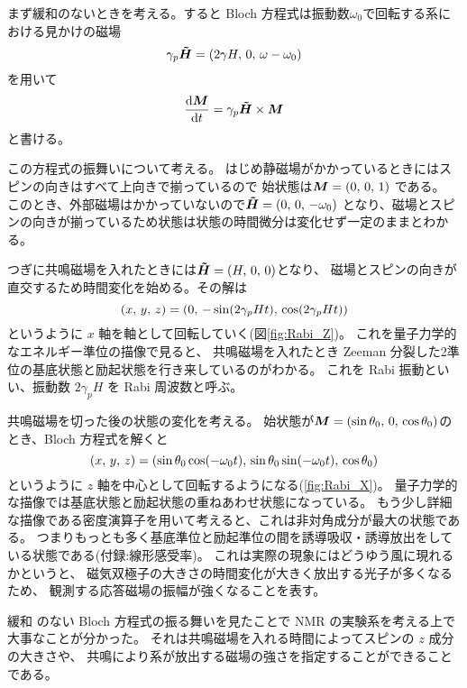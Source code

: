 \documentclass[11pt,dvipdfmx,a4paper]{jsarticle}
\begin{document}
まず緩和のないときを考える。すると Bloch 方程式は振動数\(\omega_0\)で回転する系における見かけの磁場
\begin{equation}
	\gamma_p \vb*{\tilde{H}} = \qty(2\gamma H,\,0,\,\omega-\omega_0)
\end{equation}
を用いて
\begin{equation}
	\dv{\vb*{M}}{t} = \gamma_p \vb*{\tilde{H}} \times \vb*{M}
\end{equation}
と書ける。

この方程式の振舞いについて考える。
はじめ静磁場がかかっているときにはスピンの向きはすべて上向きで揃っているので
始状態は\(\vb*{M}=(0,\,0,\,1)\)
である。
このとき、外部磁場はかかっていないので\(\vb*{\tilde{H}}=(0,\,0,\,-\omega_0)\)
となり、磁場とスピンの向きが揃っているため状態は状態の時間微分は変化せず一定のままとわかる。

つぎに共鳴磁場を入れたときには\(\vb*{\tilde{H}}=(H,\,0,\,0)\)となり、
磁場とスピンの向きが直交するため時間変化を始める。その解は
\begin{equation}
	(x,\,y,\,z) = \qty(0,\,-\sin(2\gamma_p Ht),\,\cos(2\gamma_p Ht))
\end{equation}
というように \(x\) 軸を軸として回転していく(図\ref{fig:Rabi_Z})。
これを量子力学的なエネルギー準位の描像で見ると、
共鳴磁場を入れたとき Zeeman 分裂した2準位の基底状態と励起状態を行き来しているのがわかる。
これを Rabi 振動といい、振動数 \(2\gamma_p H\) を Rabi 周波数と呼ぶ。

共鳴磁場を切った後の状態の変化を考える。
始状態が\(\vb*{M}=(\sin\theta_0,\,0,\,\cos\theta_0)\)のとき、Bloch 方程式を解くと
\begin{equation}
	(x,\,y,\,z) =
	\qty(\sin\theta_0\cos(-\omega_0 t),\,
	\sin\theta_0\sin(-\omega_0 t),\,\cos\theta_0)
\end{equation}
というように \(z\) 軸を中心として回転するようになる(\ref{fig:Rabi_X})。
量子力学的な描像では基底状態と励起状態の重ねあわせ状態になっている。
もう少し詳細な描像である密度演算子を用いて考えると、これは非対角成分が最大の状態である。
つまりもっとも多く基底準位と励起準位の間を誘導吸収・誘導放出をしている状態である(付録:線形感受率)。
これは実際の現象にはどうゆう風に現れるかというと、
磁気双極子の大きさの時間変化が大きく放出する光子が多くなるため、
観測する応答磁場の振幅が強くなることを表す。

緩和 のない Bloch 方程式の振る舞いを見たことで NMR の実験系を考える上で大事なことが分かった。
それは共鳴磁場を入れる時間によってスピンの \(z\) 成分の大きさや、
共鳴により系が放出する磁場の強さを指定することができることである。
\end{document}
